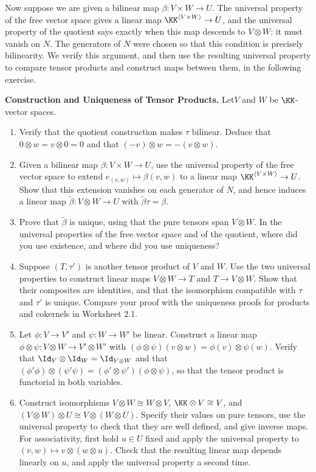 \documentclass[12pt,reqno]{amsart}
\begin{document}
Now suppose we are given a bilinear map $\beta:V\times W\to U$. The universal property of the free vector space gives a linear map $\KK^{\langle V\times W\rangle}\to U$, and the universal property of the quotient says exactly when this map descends to $V\otimes W$: it must vanish on $N$. The generators of $N$ were chosen so that this condition is precisely bilinearity. We verify this argument, and then use the resulting universal property to compare tensor products and construct maps between them, in the following exercise.

\hrulefill

\begin{problems}
\item\label{t:construction} \textbf{Construction and Uniqueness of Tensor Products.} Let$V$ and $W$ be $\KK$-vector spaces.
\begin{enumerate}
\item Verify that the quotient construction makes $\tau$ bilinear. Deduce that $0\otimes w=v\otimes0=0$ and that $(-v)\otimes w=-(v\otimes w)$.
\item Given a bilinear map $\beta:V\times W\to U$, use the universal property of the free vector space to extend $e_{(v,w)}\mapsto\beta(v,w)$ to a linear map $\KK^{\langle V\times W\rangle}\to U$. Show that this extension vanishes on each generator of $N$, and hence induces a linear map $\widetilde\beta:V\otimes W\to U$ with $\widetilde\beta\tau=\beta$.
\item Prove that $\widetilde\beta$ is unique, using that the pure tensors span $V\otimes W$. In the universal properties of the free vector space and of the quotient, where did you use existence, and where did you use uniqueness?
\item Suppose $(T,\tau')$ is another tensor product of $V$ and $W$. Use the two universal properties to construct linear maps $V\otimes W\to T$ and $T\to V\otimes W$. Show that their composites are identities, and that the isomorphism compatible with $\tau$ and $\tau'$ is unique. Compare your proof with the uniqueness proofs for products and cokernels in Worksheet 2.1.
\item Let $\phi:V\to V'$ and $\psi:W\to W'$ be linear. Construct a linear map $\phi\otimes\psi:V\otimes W\to V'\otimes W'$ with $(\phi\otimes\psi)(v\otimes w)=\phi(v)\otimes\psi(w)$. Verify that $\Id_V\otimes\Id_W=\Id_{V\otimes W}$ and that $(\phi'\phi)\otimes(\psi'\psi)=(\phi'\otimes\psi')(\phi\otimes\psi)$, so that the tensor product is functorial in both variables.
\item Construct isomorphisms $V\otimes W\cong W\otimes V$, $\KK\otimes V\cong V$, and $(V\otimes W)\otimes U\cong V\otimes(W\otimes U)$. Specify their values on pure tensors, use the universal property to check that they are well defined, and give inverse maps. For associativity, first hold $u\in U$ fixed and apply the universal property to $(v,w)\mapsto v\otimes(w\otimes u)$. Check that the resulting linear map depends linearly on $u$, and apply the universal property a second time.
\end{enumerate}
\end{problems}
\end{document}
